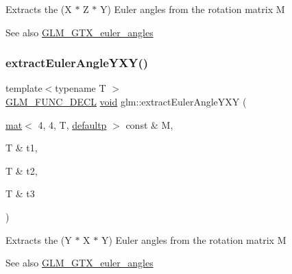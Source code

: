 Extracts the (X $\ast$ Z $\ast$ Y) Euler angles from the rotation matrix M \begin{DoxySeeAlso}{See also}
\hyperlink{group__gtx__euler__angles}{G\+L\+M\+\_\+\+G\+T\+X\+\_\+euler\+\_\+angles} 
\end{DoxySeeAlso}
\mbox{\label{group__gtx__euler__angles_gaab8868556361a190db94374e9983ed39}} 
\subsubsection{\texorpdfstring{extract\+Euler\+Angle\+Y\+X\+Y()}{extractEulerAngleYXY()}}
{\footnotesize\ttfamily template$<$typename T $>$ \\
\hyperlink{setup_8hpp_ab2d052de21a70539923e9bcbf6e83a51}{G\+L\+M\+\_\+\+F\+U\+N\+C\+\_\+\+D\+E\+CL} \hyperlink{_s_d_l__opengles2__gl2ext_8h_ae5d8fa23ad07c48bb609509eae494c95}{void} glm\+::extract\+Euler\+Angle\+Y\+XY (\begin{DoxyParamCaption}\item[{\hyperlink{structglm_1_1mat}{mat}$<$ 4, 4, T, \hyperlink{namespaceglm_a36ed105b07c7746804d7fdc7cc90ff25a9d21ccd8b5a009ec7eb7677befc3bf51}{defaultp} $>$ const \&}]{M,  }\item[{T \&}]{t1,  }\item[{T \&}]{t2,  }\item[{T \&}]{t3 }\end{DoxyParamCaption})}

Extracts the (Y $\ast$ X $\ast$ Y) Euler angles from the rotation matrix M \begin{DoxySeeAlso}{See also}
\hyperlink{group__gtx__euler__angles}{G\+L\+M\+\_\+\+G\+T\+X\+\_\+euler\+\_\+angles} 
\end{DoxySeeAlso}
\mbox{\label{group__gtx__euler__angles_gaf0937518e63037335a0e8358b6f053c5}} 
